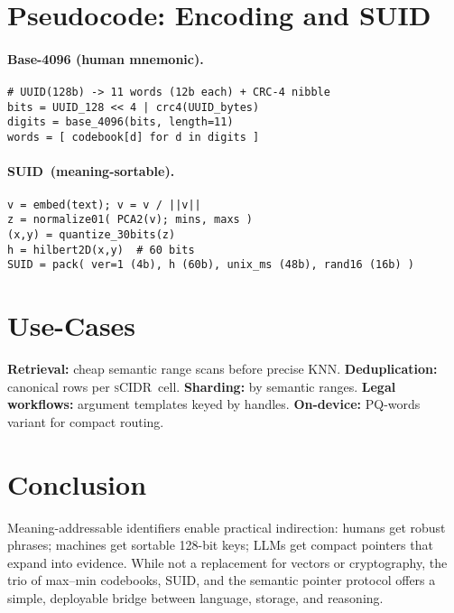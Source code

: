 \documentclass[11pt]{article}
\newcommand{\suid}{\textsc{SUID}}
\newcommand{\scidr}{\textsc{sCIDR}}
\newcommand{\pq}{\textsc{PQ}}
\begin{document}
\section*{Pseudocode: Encoding and \suid}
\paragraph{Base-4096 (human mnemonic).}
\begin{lstlisting}[basicstyle=\ttfamily\small, frame=single]
# UUID(128b) -> 11 words (12b each) + CRC-4 nibble
bits = UUID_128 << 4 | crc4(UUID_bytes)
digits = base_4096(bits, length=11)
words = [ codebook[d] for d in digits ]
\end{lstlisting}

\paragraph{\suid\ (meaning-sortable).}
\begin{lstlisting}[basicstyle=\ttfamily\small, frame=single]
v = embed(text); v = v / ||v||
z = normalize01( PCA2(v); mins, maxs )
(x,y) = quantize_30bits(z)
h = hilbert2D(x,y)  # 60 bits
SUID = pack( ver=1 (4b), h (60b), unix_ms (48b), rand16 (16b) )
\end{lstlisting}

\section*{Use-Cases}
\textbf{Retrieval:} cheap semantic range scans before precise KNN. \textbf{Deduplication:} canonical rows per \scidr\ cell. \textbf{Sharding:} by semantic ranges. \textbf{Legal workflows:} argument templates keyed by handles. \textbf{On-device:} \pq-words variant for compact routing.

\section*{Conclusion}
Meaning-addressable identifiers enable practical indirection: humans get robust phrases; machines get sortable 128-bit keys; LLMs get compact pointers that expand into evidence. While not a replacement for vectors or cryptography, the trio of max--min codebooks, \suid, and the semantic pointer protocol offers a simple, deployable bridge between language, storage, and reasoning.
\end{document}

